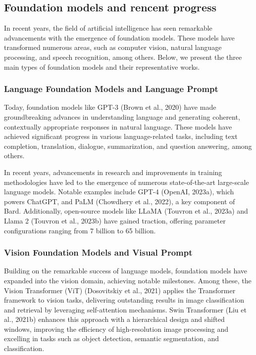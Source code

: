 \subsection{Foundation models and rencent progress}

In recent years, the field of artificial intelligence has seen remarkable advancements with the emergence of foundation models. These models have transformed numerous areas, such as computer vision, natural language processing, and speech recognition, among others. Below, we present the three main types of foundation models and their representative works.

\subsubsection{Language Foundation Models and Language Prompt}

Today, foundation models like GPT-3 (Brown et al., 2020) have made groundbreaking advances in understanding language and generating coherent, contextually appropriate responses in natural language. These models have achieved significant progress in various language-related tasks, including text completion, translation, dialogue, summarization, and question answering, among others.

In recent years, advancements in research and improvements in training methodologies have led to the emergence of numerous state-of-the-art large-scale language models. Notable examples include GPT-4 (OpenAI, 2023a), which powers ChatGPT, and PaLM (Chowdhery et al., 2022), a key component of Bard. Additionally, open-source models like LLaMA (Touvron et al., 2023a) and Llama 2 (Touvron et al., 2023b) have gained traction, offering parameter configurations ranging from 7 billion to 65 billion. 

\subsubsection{Vision Foundation Models and Visual Prompt}

Building on the remarkable success of language models, foundation models have expanded into the vision domain, achieving notable milestones. Among these, the Vision Transformer (ViT) (Dosovitskiy et al., 2021) applies the Transformer framework to vision tasks, delivering outstanding results in image classification and retrieval by leveraging self-attention mechanisms. Swin Transformer (Liu et al., 2021b) enhances this approach with a hierarchical design and shifted windows, improving the efficiency of high-resolution image processing and excelling in tasks such as object detection, semantic segmentation, and classification.

